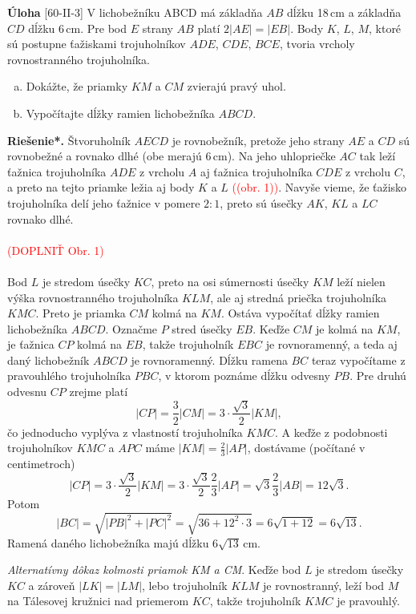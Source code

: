\documentclass{article}
\newcommand{\rieh}{\textbf{Riešenie*.} }
\newcommand\todo[1]{\noindent\textcolor{red}{(#1)}}
\newcommand{\problem}[3]{
  \begin{tcolorbox}[breakable,notitle,boxrule=0pt,colback=light-gray,colframe=light-gray]
    \textbf{Úloha}
    [#1] #2
  \end{tcolorbox}
  \noindent#3
}
\begin{document}
\problem{60-II-3}{
V lichobežníku ABCD má základňa $AB$ dĺžku 18\,cm a základňa $CD$ dĺžku 6\,cm. Pre bod $E$ strany $AB$ platí $2|AE| = |EB|$. Body $K$, $L$, $M$, ktoré sú postupne ťažiskami trojuholníkov $ADE$, $CDE$, $BCE$, tvoria vrcholy rovnostranného trojuholníka. 
\begin{enumerate}[a)]
    \item Dokážte, že priamky $KM$ a $CM$ zvierajú pravý uhol.
    \item Vypočítajte dĺžky ramien lichobežníka $ABCD$.
\end{enumerate}
}{
\rieh Štvoruholník $AECD$ je rovnobežník, pretože jeho strany $AE$ a $CD$ sú rovnobežné a rovnako dlhé (obe merajú 6\,cm). Na jeho uhlopriečke $AC$ tak leží ťažnica trojuholníka $ADE$ z vrcholu $A$ aj ťažnica trojuholníka $CDE$ z vrcholu $C$, a preto na tejto priamke ležia aj body $K$ a $L$ \todo{(obr. 1)}. Navyše vieme, že ťažisko trojuholníka delí jeho ťažnice v pomere $2 : 1$, preto sú úsečky $AK$, $KL$ a $LC$ rovnako dlhé.\\
\\
\todo{DOPLNIŤ Obr. 1}\\
\\
Bod $L$ je stredom úsečky $KC$, preto na osi súmernosti úsečky $KM$ leží nielen výška rovnostranného trojuholníka $KLM$, ale aj stredná priečka trojuholníka $KMC$. Preto je priamka $CM$ kolmá na $KM$. Ostáva vypočítať dĺžky ramien lichobežníka $ABCD$. Označme $P$ stred úsečky $EB$. Keďže $CM$ je kolmá na $KM$, je ťažnica $CP$ kolmá na $EB$, takže trojuholník $EBC$ je rovnoramenný, a teda aj daný lichobežník $ABCD$ je rovnoramenný. Dĺžku ramena $BC$ teraz vypočítame z pravouhlého trojuholníka $PBC$, v ktorom poznáme dĺžku odvesny $PB$. Pre druhú odvesnu $CP$ zrejme platí
$$|CP| = \frac{3}{2} |CM| = 3\cdot \frac{\sqrt{3}}{2}|KM|,$$
čo jednoducho vyplýva z vlastností trojuholníka $KMC$. A keďže z podobnosti trojuholníkov $KMC$ a $APC$ máme $|KM| =\frac{2}{3}|AP|$, dostávame (počítané v centimetroch)
$$|CP| = 3\cdot \frac{\sqrt{3}}{2}|KM| = 3\cdot \frac{\sqrt{3}}{2}\frac{2}{3}|AP| =\sqrt{3}\frac{2}{3}|AB| = 12\sqrt{3}.$$
Potom
$$|BC| =\sqrt{|PB|^2 + |PC|^2} =\sqrt{36 + 12^2\cdot3} = 6\sqrt{1 + 12} = 6\sqrt{13}.$$
Ramená daného lichobežníka majú dĺžku $6\sqrt{13}$\,cm.

\textit{Alternatívny dôkaz kolmosti priamok KM a CM}. Keďže bod $L$ je stredom úsečky $KC$ a zároveň $|LK| = |LM|$, lebo trojuholník $KLM$ je rovnostranný, leží bod $M$ na Tálesovej kružnici nad priemerom $KC$, takže trojuholník $KMC$ je pravouhlý.
}
\end{document}
